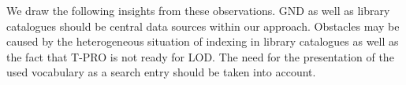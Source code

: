 We draw the following insights from these observations.
\gls{GND} as well as library catalogues should be central data sources within our approach.
Obstacles may be caused by
the heterogeneous situation of indexing in library catalogues
as well as the fact that T-PRO is not ready for LOD.
The need for the presentation of the used vocabulary as a search entry
should be taken into account.

%
%

